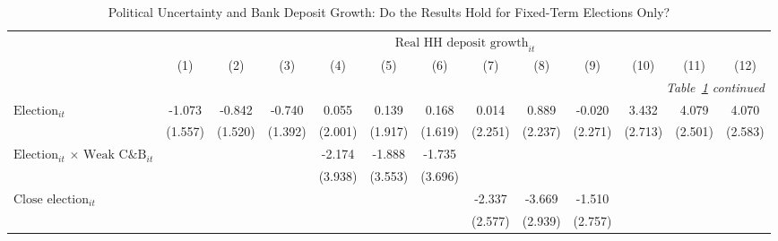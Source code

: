 \begin{longtable}{m{4.5cm}*{12}{c}}                                         \caption{Political Uncertainty and Bank Deposit Growth: Do the Results Hold for Fixed-Term Elections Only?\label{robustfixed2}}\\                                         \toprule                                         &\multicolumn{12}{c}{$\text{Real HH deposit growth}_{it}$} \\ \cmidrule(lr){2-13}
                    &         (1)   &         (2)   &         (3)   &         (4)   &         (5)   &         (6)   &         (7)   &         (8)   &         (9)   &        (10)   &        (11)   &        (12)   \\
\midrule\endfirsthead                                         \multicolumn{13}{r}{\textit{Table~\ref{robustfixed2} continued}} \\                                         \toprule\endhead\midrule\endfoot\endlastfoot
$\text{Election}_{it}$&      -1.073   &      -0.842   &      -0.740   &       0.055   &       0.139   &       0.168   &       0.014   &       0.889   &      -0.020   &       3.432   &       4.079   &       4.070   \\
                    &     (1.557)   &     (1.520)   &     (1.392)   &     (2.001)   &     (1.917)   &     (1.619)   &     (2.251)   &     (2.237)   &     (2.271)   &     (2.713)   &     (2.501)   &     (2.583)   \\
\multirow{2}{4cm}{$\text{Election}_{it}$ $\times$ $\text{Weak C\&B}_{it}$}&               &               &               &      -2.174   &      -1.888   &      -1.735   &               &               &               &               &               &               \\
                    &               &               &               &     (3.938)   &     (3.553)   &     (3.696)   &               &               &               &               &               &               \\
\multirow{2}{4cm}{$\text{Close election}_{it}$}&               &               &               &               &               &               &      -2.337   &      -3.669   &      -1.510   &               &               &               \\
                    &               &               &               &               &               &               &     (2.577)   &     (2.939)   &     (2.757)   &               &               &               \\

\end{longtable}
